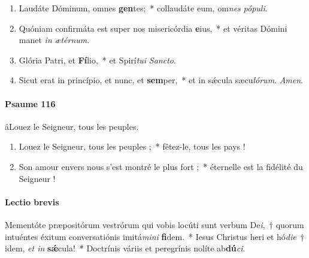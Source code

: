 \documentclass[twoside]{article}
\begin{document}
\begin{paracol}[1]{2}


\begin{enumerate}[wide, itemsep=0mm, labelwidth=!, labelindent=0pt, label=\color{gregoriocolor}\theenumi]
\item {} Laudáte Dóminum, omnes \textbf{gen}tes;\rubrique{)}~* \GreSpecial{+} collaudáte eum, om\textit{nes} \textit{pó}\textit{pu}\textit{li}.
\item Quóniam confirmáta est super nos misericórdia \textbf{e}ius,~* et véritas Dómini manet \textit{in} \textit{æ}\textit{tér}\textit{num}.
\item Glória Patri, et \textbf{Fí}lio,~* et Spirí\textit{tu}\textit{i} \textit{Sanc}\textit{to}.
\item Sicut erat in princípio, et nunc, et \textbf{sem}per,~* et in sǽcula sæcu\textit{ló}\textit{rum}. \textit{A}\textit{men}.
\end{enumerate}

\switchcolumn

\paragraph{Psaume 116}

\aa Louez le Seigneur, tous les peuples.


\begin{enumerate}[wide, itemsep=0mm, labelwidth=!, labelindent=0pt, label=\color{gregoriocolor}\theenumi]
\item Louez le Seigneur, tous les peuples ;~* fêtez-le, tous les pays !
\item Son amour envers nous s'est montré le plus fort ;~* éternelle est la fidélité du Seigneur !
\end{enumerate}

\switchcolumn*


\paragraph{Lectio brevis}
Mementóte præpositórum vestrórum qui vobis locúti sunt verbum De\textit{i},~† quorum intuéntes éxitum conversatiónis imitá\textit{mini} \textbf{fi}dem.~* Iesus Christus heri et hó\textit{die}~† idem, \textit{et in} \textbf{sǽ}cula!~* Doctrínis váriis et peregrínis nolíte ab\textbf{dú}\textit{ci}.


\switchcolumn


\end{paracol}
\end{document}
